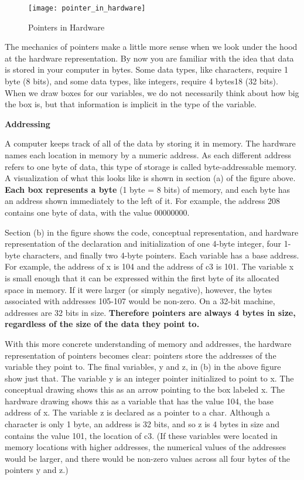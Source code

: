 \documentclass[11pt, a4paper]{article}
\begin{document}
\begin{figure}[htpb]
  \centering
  \texttt{[image: pointer\_in\_hardware]}
  \caption{Pointers in Hardware}
  \label{fig:pointers_in_hardware}
\end{figure}



The mechanics of pointers make a little more sense when we look under the hood at the hardware representation. By now you are familiar with the idea that data is stored in your computer in bytes. Some data types, like characters, require 1 byte (8 bits), and some data types, like integers, require 4 bytes18 (32 bits). When we draw boxes for our variables, we do not necessarily think about how big the box is, but that information is implicit in the type of the variable.

\textbf{Addressing}

A computer keeps track of all of the data by storing it in memory. The hardware names each location in memory by a numeric address. As each different address refers to one byte of data, this type of storage is called byte-addressable memory. A visualization of what this looks like is shown in section (a) of the figure above. \textbf{Each box represents a byte} (1 byte = 8 bits) of memory, and each byte has an address shown immediately to the left of it. For example, the address 208 contains one byte of data, with the value 00000000.

Section (b) in the figure shows the code, conceptual representation, and hardware representation of the declaration and initialization of one 4-byte integer, four 1-byte characters, and finally two 4-byte pointers. Each variable has a base address. For example, the address of x is 104 and the address of c3 is 101. The variable x is small enough that it can be expressed within the first byte of its allocated space in memory. If it were larger (or simply negative), however, the bytes associated with addresses 105-107 would be non-zero. On a 32-bit machine, addresses are 32 bits in size. \textbf{Therefore pointers are always 4 bytes in size, regardless of the size of the data they point to.}

With this more concrete understanding of memory and addresses, the hardware representation of pointers becomes clear: pointers store the addresses of the variable they point to. The final variables, y and z, in (b) in the above figure show just that. The variable y is an integer pointer initialized to point to x. The conceptual drawing shows this as an arrow pointing to the box labeled x. The hardware drawing shows this as a variable that has the value 104, the base address of x. The variable z is declared as a pointer to a char. Although a character is only 1 byte, an address is 32 bits, and so z is 4 bytes in size and contains the value 101, the location of c3. (If these variables were located in memory locations with higher addresses, the numerical values of the addresses would be larger, and there would be non-zero values across all four bytes of the pointers y and z.)
\end{document}
